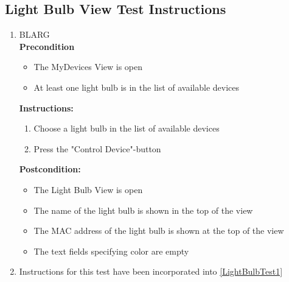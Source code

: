 \documentclass[a4paper]{article}
\newlength{\testlabellength}
\newenvironment{testlist}{\begin{enumerate}[label=\bfseries Instruction \thesubsection.\arabic* , labelindent=0pt, labelwidth=\testlabellength , leftmargin=2cm]}{\end{enumerate}}
\newenvironment{precondition}{
{\color{white}BLARG}\\ 
\textbf{Precondition}
\begin{itemize}[labelindent=0cm, labelwidth=2cm , leftmargin=1cm]
}
{\end{itemize}}
\newenvironment{instruction}{
\textbf{Instructions:}
\begin{enumerate}[label=\bfseries  \arabic*., labelindent=0cm, labelwidth=2cm , leftmargin=1cm]
}
{\end{enumerate}}
\newenvironment{postcondition}{
\textbf{Postcondition:}
\begin{itemize}[labelindent=0cm, labelwidth=2cm , leftmargin=1cm]
}
{\end{itemize}}
\begin{document}
\begin{appendices}
\subsection{Light Bulb View Test Instructions}
\begin{testlist}
    \item
    	\begin{precondition}	\label{LightBulbTest1}
    		\item The MyDevices View is open
    		\item At least one light bulb is in the list of available devices
    	\end{precondition}
    	\begin{instruction}
    		\item Choose a light bulb in the list of available devices
    		\item Press the "Control Device"-button
    	\end{instruction}
    	\begin{postcondition}
    		\item The Light Bulb View is open
    		\item The name of the light bulb is shown in the top of the view
    		\item The MAC address of the light bulb is shown at the top of the view
    		\item The text fields specifying color are empty
    	\end{postcondition}


	\item
		Instructions for this test have been incorporated into \ref{LightBulbTest1}

    	

\end{testlist}
\end{appendices}
\end{document}
